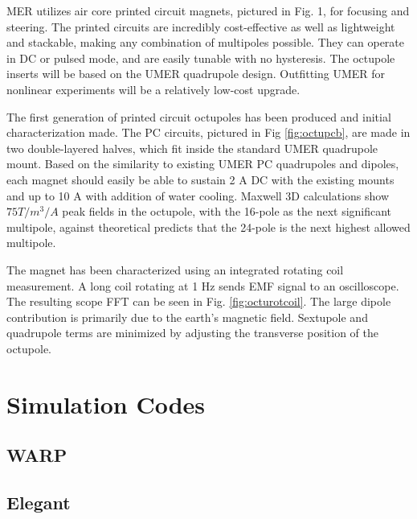 MER utilizes air core printed circuit magnets, pictured in Fig. 1, for focusing and steering. The printed circuits are incredibly cost-effective as well as lightweight and stackable, making any combination of multipoles possible. They can operate in DC or pulsed mode, and are easily tunable with no hysteresis. 
The octupole inserts will be based on the UMER quadrupole design. Outfitting UMER for nonlinear experiments will be a relatively low-cost upgrade.

The first generation of printed circuit octupoles has been produced and initial characterization made. The PC circuits, pictured in Fig \ref{fig:octupcb}, are made in two double-layered halves, which fit inside the standard UMER quadrupole mount. Based on the similarity to existing UMER PC quadrupoles and dipoles, each magnet should easily be able to sustain 2 A DC with the existing mounts and up to 10 A with addition of water cooling. Maxwell 3D calculations show $75 T/m^3/A$ peak fields in the octupole, with the 16-pole as the next significant multipole, against theoretical predicts that the 24-pole is the next highest allowed multipole. \cite{VenturiniThesis}

The magnet has been characterized using an integrated rotating coil measurement. A long coil rotating at 1 Hz sends EMF signal to an oscilloscope. The resulting scope FFT can be seen in Fig. \ref{fig:octurotcoil}. The large dipole contribution is primarily due to the earth’s magnetic field. Sextupole and quadrupole terms are minimized by adjusting the transverse position of the octupole.


\cite{BaumgartnerNAPAC2016}

\section{Simulation Codes}
\subsection{WARP}
\cite{warp}

\subsection{Elegant}
\cite{elegant}

